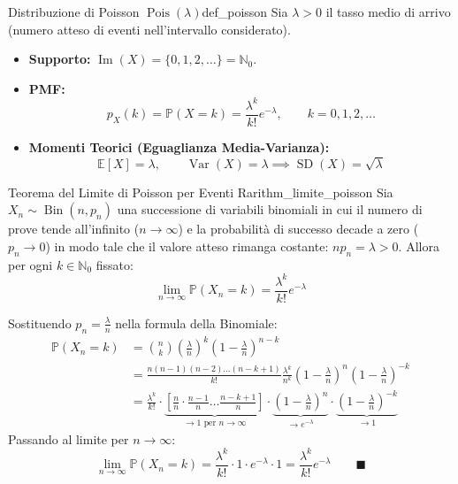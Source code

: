 \begin{definizione}{Distribuzione di Poisson $\operatorname{Pois}(\lambda)$}{def_poisson}
Sia $\lambda > 0$ il tasso medio di arrivo (numero atteso di eventi nell'intervallo considerato).
\begin{itemize}
    \item \textbf{Supporto:} $\operatorname{Im}(X) = \{0, 1, 2, \dots\} = \mathbb{N}_0$.
    \item \textbf{PMF:}
    \begin{equation}
        p_X(k) = \mathbb{P}(X = k) = \frac{\lambda^k}{k!} e^{-\lambda}, \qquad k = 0, 1, 2, \dots
    \end{equation}
    \item \textbf{Momenti Teorici (Eguaglianza Media-Varianza):}
    \begin{equation}
        \mathbb{E}[X] = \lambda, \qquad \operatorname{Var}(X) = \lambda \implies \operatorname{SD}(X) = \sqrt{\lambda}
    \end{equation}
\end{itemize}
\end{definizione}

\begin{teorema}{Teorema del Limite di Poisson per Eventi Rari}{thm_limite_poisson}
Sia $X_n \sim \operatorname{Bin}(n, p_n)$ una successione di variabili binomiali in cui il numero di prove tende all'infinito ($n \to \infty$) e la probabilità di successo decade a zero ($p_n \to 0$) in modo tale che il valore atteso rimanga costante: $n p_n = \lambda > 0$.
Allora per ogni $k \in \mathbb{N}_0$ fissato:
\begin{equation}
    \lim_{n \to \infty} \mathbb{P}(X_n = k) = \frac{\lambda^k}{k!} e^{-\lambda}
\end{equation}
\end{teorema}

\begin{dimostrazione}
Sostituendo $p_n = \frac{\lambda}{n}$ nella formula della Binomiale:
\begin{align}
    \mathbb{P}(X_n = k) &= \binom{n}{k} \left(\frac{\lambda}{n}\right)^k \left(1 - \frac{\lambda}{n}\right)^{n-k} \\
    &= \frac{n(n-1)(n-2)\dots(n-k+1)}{k!} \frac{\lambda^k}{n^k} \left(1 - \frac{\lambda}{n}\right)^n \left(1 - \frac{\lambda}{n}\right)^{-k} \\
    &= \frac{\lambda^k}{k!} \cdot \underbrace{\left[ \frac{n}{n} \cdot \frac{n-1}{n} \dots \frac{n-k+1}{n} \right]}_{\to 1 \text{ per } n \to \infty} \cdot \underbrace{\left(1 - \frac{\lambda}{n}\right)^n}_{\to e^{-\lambda}} \cdot \underbrace{\left(1 - \frac{\lambda}{n}\right)^{-k}}_{\to 1}
\end{align}
Passando al limite per $n \to \infty$:
\begin{equation}
    \lim_{n \to \infty} \mathbb{P}(X_n = k) = \frac{\lambda^k}{k!} \cdot 1 \cdot e^{-\lambda} \cdot 1 = \frac{\lambda^k}{k!} e^{-\lambda} \qquad \blacksquare
\end{equation}
\end{dimostrazione}

